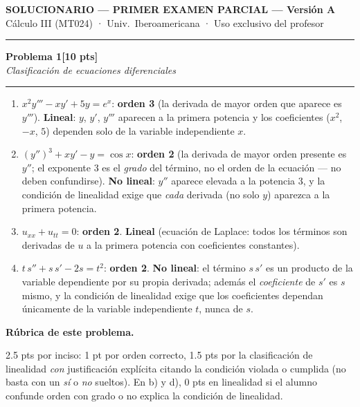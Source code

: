 \documentclass[11pt,letterpaper]{article}
\newcommand{\problema}[3]{%
  \bigskip\bigskip\noindent
  {\Large\textbf{Problema #1}}\hfill\textbf{[#2 pts]}\\[3pt]
  {\small\itshape #3}\par
  \vspace{2pt}\hrule\vspace{8pt}
}
\newenvironment{rubrica}{%
  \begin{mdframed}[linecolor=black,linewidth=0.6pt,
    innerleftmargin=8pt,innerrightmargin=8pt,innertopmargin=5pt,innerbottommargin=5pt]
  \small\textbf{Rúbrica de este problema.}\par\smallskip
}{\end{mdframed}}
\begin{document}
\begin{center}
{\Large\bfseries SOLUCIONARIO — PRIMER EXAMEN PARCIAL --- Versión A}\\[2pt]
{\small Cálculo III (MT024) · Univ.\ Iberoamericana · Uso exclusivo del profesor}
\end{center}

\vspace{4pt}\hrule

\vspace{10pt}

\problema{1}{10}{Clasificación de ecuaciones diferenciales}

\begin{enumerate}[label=\textbf{\alph*)}, itemsep=8pt]
  \item $x^2 y''' - x y' + 5y = e^x$: \textbf{orden 3} (la derivada de mayor orden que aparece es $y'''$). \textbf{Lineal}: $y$, $y'$, $y'''$ aparecen a la primera potencia y los coeficientes ($x^2$, $-x$, $5$) dependen solo de la variable independiente $x$.
  \item $(y'')^3 + x y' - y = \cos x$: \textbf{orden 2} (la derivada de mayor orden presente es $y''$; el exponente 3 es el \emph{grado} del término, no el orden de la ecuación — no deben confundirse). \textbf{No lineal}: $y''$ aparece elevada a la potencia 3, y la condición de linealidad exige que \emph{cada} derivada (no solo $y$) aparezca a la primera potencia.
  \item $u_{xx}+u_{tt}=0$: \textbf{orden 2}. \textbf{Lineal} (ecuación de Laplace: todos los términos son derivadas de $u$ a la primera potencia con coeficientes constantes).
  \item $t\,s'' + s\,s' - 2s = t^2$: \textbf{orden 2}. \textbf{No lineal}: el término $s\,s'$ es un producto de la variable dependiente por su propia derivada; además el \emph{coeficiente} de $s'$ es $s$ mismo, y la condición de linealidad exige que los coeficientes dependan únicamente de la variable independiente $t$, nunca de $s$.
\end{enumerate}

\begin{rubrica}
2.5 pts por inciso: 1 pt por orden correcto, 1.5 pts por la clasificación de linealidad \emph{con} justificación explícita citando la condición violada o cumplida (no basta con un \emph{sí} o \emph{no} sueltos). En b) y d), 0 pts en linealidad si el alumno confunde orden con grado o no explica la condición de linealidad.
\end{rubrica}
\end{document}
